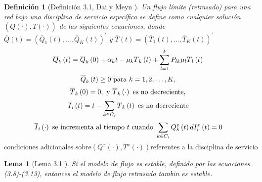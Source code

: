 \documentclass{article}
\newtheorem{Def}{Definición}
\newtheorem{Lema}{Lema}
\begin{document}
\begin{Def}[Definici\'on 3.1, Dai y Meyn \cite{DaiSean}]
Un flujo l\'imite (retrasado) para una red bajo una disciplina de
servicio espec\'ifica se define como cualquier soluci\'on
 $\left(\overline{Q}\left(\cdot\right),\overline{T}\left(\cdot\right)\right)$ de las siguientes ecuaciones, donde
$\overline{Q}\left(t\right)=\left(\overline{Q}_{1}\left(t\right),\ldots,\overline{Q}_{K}\left(t\right)\right)^{'}$
y
$\overline{T}\left(t\right)=\left(\overline{T}_{1}\left(t\right),\ldots,\overline{T}_{K}\left(t\right)\right)^{'}$
\begin{equation}\label{Eq.3.8}
\overline{Q}_{k}\left(t\right)=\overline{Q}_{k}\left(0\right)+\alpha_{k}t-\mu_{k}\overline{T}_{k}\left(t\right)+\sum_{l=1}^{k}P_{lk}\mu_{l}\overline{T}_{l}\left(t\right)\\
\end{equation}
\begin{equation}\label{Eq.3.9}
\overline{Q}_{k}\left(t\right)\geq0\textrm{ para }k=1,2,\ldots,K,\\
\end{equation}
\begin{equation}\label{Eq.3.10}
\overline{T}_{k}\left(0\right)=0,\textrm{ y }\overline{T}_{k}\left(\cdot\right)\textrm{ es no decreciente},\\
\end{equation}
\begin{equation}\label{Eq.3.11}
\overline{I}_{i}\left(t\right)=t-\sum_{k\in C_{i}}\overline{T}_{k}\left(t\right)\textrm{ es no decreciente}\\
\end{equation}
\begin{equation}\label{Eq.3.12}
\overline{I}_{i}\left(\cdot\right)\textrm{ se incrementa al tiempo }t\textrm{ cuando }\sum_{k\in C_{i}}Q_{k}^{x}\left(t\right)dI_{i}^{x}\left(t\right)=0\\
\end{equation}
\begin{equation}\label{Eq.3.13}
\textrm{condiciones adicionales sobre
}\left(Q^{x}\left(\cdot\right),T^{x}\left(\cdot\right)\right)\textrm{
referentes a la disciplina de servicio}
\end{equation}
\end{Def}

\begin{Lema}[Lema 3.1 \cite{Chen}]\label{Lema3.1}
Si el modelo de flujo es estable, definido por las ecuaciones
(3.8)-(3.13), entonces el modelo de flujo retrasado tambin es
estable.
\end{Lema}
\end{document}
